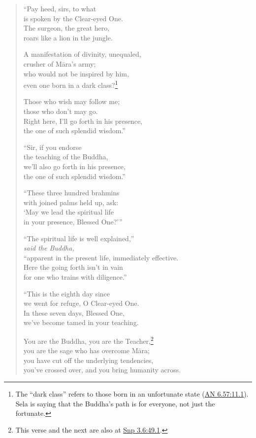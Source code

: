 \documentclass[12pt,openany]{book}%
\newcommand*{\scspeaker}[1]{\hspace{2em}\textit{#1}}
\begin{document}
\begin{verse}
“Pay heed, sirs, to what \\
is spoken by the Clear-eyed One. \\
The surgeon, the great hero, \\
roars like a lion in the jungle. 

A manifestation of divinity, unequaled, \\
crusher of \textsanskrit{Māra}’s army; \\
who would not be inspired by him, \\
even one born in a dark class?\footnote{The “dark class” refers to those born in an unfortunate state (\href{https://suttacentral.net/an6.57/en/sujato\#11.1}{AN 6.57:11.1}). Sela is saying that the Buddha’s path is for everyone, not just the fortunate. } 

Those who wish may follow me; \\
those who don’t may go. \\
Right here, I’ll go forth in his presence, \\
the one of such splendid wisdom.” 

“Sir, if you endorse \\
the teaching of the Buddha, \\
we’ll also go forth in his presence, \\
the one of such splendid wisdom.” 

“These three hundred brahmins \\
with joined palms held up, ask: \\
‘May we lead the spiritual life \\
in your presence, Blessed One?’” 

“The spiritual life is well explained,” \\
\scspeaker{said the Buddha, }\\
“apparent in the present life, immediately effective. \\
Here the going forth isn’t in vain \\
for one who trains with diligence.” 

“This is the eighth day since \\
we went for refuge, O Clear-eyed One. \\
In these seven days, Blessed One, \\
we’ve become tamed in your teaching. 

You are the Buddha, you are the Teacher,\footnote{This verse and the next are also at \href{https://suttacentral.net/snp3.6/en/sujato\#49.1}{Snp 3.6:49.1}. } \\
you are the sage who has overcome \textsanskrit{Māra}; \\
you have cut off the underlying tendencies, \\
you’ve crossed over, and you bring humanity across. 


\end{verse}
\end{document}

